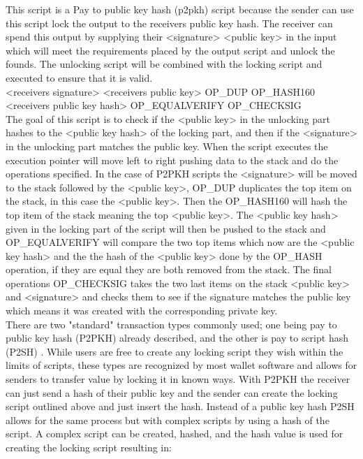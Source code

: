 This script is a Pay to public key hash (p2pkh) script because the sender can use this script lock the output to the receivers public key hash. The receiver can spend this output by supplying their <signature> <public key> in the input which will meet the requirements placed by the output script and unlock the founds. The unlocking script will be combined with the locking script and executed to ensure that it is valid. 
\\

<receivers signature> <receivers public key> OP\_DUP OP\_HASH160 <receivers public key hash> OP\_EQUALVERIFY OP\_CHECKSIG
\\

The goal of this script is to check if the <public key> in the unlocking part hashes to the <public key hash> of the locking part, and then if the <signature> in the unlocking part matches the public key.
When the script executes the execution pointer will move left to right pushing data to the stack and do the operations specified.
In the case of P2PKH scripts the <signature> will be moved to the stack followed by the <public key>, OP\_DUP duplicates the top item on the stack, in this case the <public key>. Then the OP\_HASH160 will hash the top item of the stack meaning the top <public key>. The <public key hash> given in the locking part of the script will then be pushed to the stack and OP\_EQUALVERIFY will compare the two top items which now are the <public key hash> and the the hash of the <public key> done by the OP\_HASH operation, if they are equal they are both removed from the stack. The final operations OP\_CHECKSIG takes the two last items on the stack <public key> and <signature> and checks them to see if the signature matches the public key which means it was created with the corresponding private key.
\\

There are two "standard" transaction types commonly used; one being pay to public key hash (P2PKH) already described, and the other is pay to script hash (P2SH) \cite{BIP16}. While users are free to create any locking script they wish within the limits of scripts, these types are recognized by most wallet software and allows for senders to transfer value by locking it in known ways. With P2PKH the receiver can just send a hash of their public key and the sender can create the locking script outlined above and just insert the hash. Instead of a public key hash P2SH allows for the same process but with complex scripts by using a hash of the script. A complex script can be created, hashed, and the hash value is used for creating the locking script resulting in:
\\

